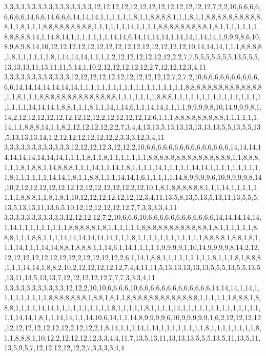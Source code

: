 3,3,3,3,3,3,3,3,3,3,3,3,3,3,3,3,12,12,12,12,12,12,12,12,12,12,12,12,12,7,2,2,10,6,6,6,6,6,6,6,6,14,6,6,14,6,6,6,14,14,14,1,1,1,1,1,1,8,1,1,8,8,8,8,1,1,1,8,1,1,8,8,8,8,8,8,8,8,8,8,8,1,1,8,1,1,1,8,8,8,8,8,8,8,8,8,1,1,1,1,1,1,14,1,1,1,1,8,8,8,8,8,8,8,8,8,1,8,1,1,1,1,1,1,1,8,8,8,8,8,14,1,14,8,14,1,1,1,1,1,1,1,14,14,6,14,14,14,14,1,14,14,1,14,14,1,9,9,9,8,6,10,8,9,8,9,8,14,10,12,12,12,12,12,12,12,12,12,12,12,12,12,12,12,10,14,14,14,1,1,1,8,8,8,8,1,8,1,1,1,1,1,1,8,1,14,14,14,1,1,1,1,2,12,12,12,12,12,12,2,2,7,7,5,5,5,5,5,5,5,13,5,5,5,13,13,13,11,13,11,11,5,14,1,10,2,12,12,12,12,12,2,7,12,12,12,3,4,11
3,3,3,3,3,3,3,3,3,3,3,3,12,12,12,12,12,12,12,12,12,12,12,7,2,7,2,10,6,6,6,6,6,6,6,6,6,6,6,6,14,14,14,14,14,14,14,1,1,1,1,1,1,1,1,1,1,1,1,1,1,1,1,1,1,1,8,8,8,8,8,8,8,8,8,8,8,8,8,8,1,1,8,1,1,1,8,8,8,8,8,8,8,8,8,8,8,8,8,8,1,1,1,1,1,1,1,8,8,8,1,1,1,1,1,1,1,1,1,1,1,1,1,1,1,1,1,1,1,1,14,14,14,1,8,8,1,1,1,8,1,1,14,1,14,6,1,1,14,14,1,1,1,1,9,9,9,9,8,10,14,9,9,9,8,1,14,2,12,12,12,12,12,12,12,12,12,2,12,12,12,12,12,6,1,1,1,8,8,8,8,8,8,8,8,8,1,1,1,1,1,1,14,1,1,8,8,8,14,1,1,8,2,12,12,12,12,2,2,7,3,4,4,13,13,5,13,13,13,13,13,13,5,5,13,5,5,13,5,13,13,13,14,1,2,12,12,12,12,12,12,2,3,3,3,12,3,4,11
3,3,3,3,3,3,3,3,3,3,3,3,12,12,12,12,3,12,12,2,10,6,6,6,6,6,6,6,6,6,6,6,6,6,6,6,14,14,14,14,14,14,14,14,14,14,1,1,1,1,8,1,1,8,1,1,1,1,1,1,1,8,8,8,8,8,8,8,8,8,8,8,8,8,8,8,1,1,8,8,8,1,1,1,8,1,8,8,1,14,8,8,8,1,1,1,14,1,1,14,1,8,1,1,1,1,14,1,1,1,1,1,14,14,1,1,1,1,1,1,1,1,1,1,8,1,1,1,1,1,1,14,14,1,8,1,1,8,8,1,1,1,14,14,1,6,1,1,1,1,1,14,8,9,9,9,9,6,10,9,9,9,9,8,14,10,2,12,12,12,12,12,12,12,12,12,12,12,12,2,12,10,1,8,1,8,8,8,8,8,8,1,1,1,14,1,1,1,1,1,1,1,1,8,8,8,1,1,8,1,8,1,10,12,12,12,12,12,12,12,3,4,11,13,5,8,13,5,13,5,13,11,13,5,5,5,13,5,13,13,11,13,6,5,10,12,12,12,12,12,12,7,7,3,3,3,3,4,11
3,3,3,3,3,3,3,3,3,3,3,12,12,12,12,7,2,10,6,6,6,10,6,6,6,6,6,6,6,6,6,6,6,6,14,14,14,14,14,1,14,1,1,1,1,1,1,1,1,1,8,8,8,8,8,1,8,1,1,1,1,1,1,8,8,8,8,8,8,8,8,8,8,8,8,1,8,1,1,1,1,1,1,8,8,8,1,1,1,8,8,1,1,1,14,14,14,14,14,14,1,1,1,8,1,1,1,1,1,1,1,1,1,1,1,1,8,8,8,8,1,8,8,1,8,1,1,1,14,1,1,1,14,14,8,8,1,8,8,8,1,1,14,6,1,14,1,1,1,1,1,9,9,9,9,1,10,14,9,9,9,9,8,14,2,12,12,12,12,12,12,12,12,12,2,12,12,12,12,2,6,1,14,1,8,8,1,1,1,1,1,1,1,1,1,8,1,1,1,8,1,8,8,8,1,1,1,14,14,1,8,8,2,10,2,12,12,12,12,12,7,4,4,11,11,5,13,13,13,13,13,5,5,5,13,5,5,13,5,13,11,13,5,13,13,7,12,12,12,12,12,7,7,7,3,3,3,4,11
3,3,3,3,3,3,3,3,3,3,3,12,12,2,10,10,6,6,6,6,10,6,6,6,6,6,6,6,6,6,6,6,6,6,14,14,14,1,14,1,1,1,1,1,1,1,1,1,8,8,8,8,8,8,8,1,8,8,1,8,1,1,8,8,8,8,8,8,8,8,8,8,8,8,8,1,1,1,1,1,1,8,8,8,1,8,8,8,1,1,1,1,14,14,1,1,1,1,1,1,1,1,1,1,8,1,1,1,1,1,8,1,1,1,1,14,1,1,1,1,1,1,1,1,1,1,1,1,1,1,1,1,14,14,1,8,1,1,14,14,1,1,14,10,6,14,1,1,14,8,9,9,9,9,6,10,9,9,9,9,9,1,6,2,12,12,12,12,12,12,12,12,12,12,12,2,12,12,2,1,8,14,1,1,1,14,1,14,1,1,1,1,1,1,1,1,8,1,1,1,1,1,1,1,1,8,1,1,8,8,8,1,10,12,2,12,12,12,12,3,3,4,4,11,7,13,5,13,11,13,13,13,5,5,5,13,5,11,13,5,11,13,5,9,5,7,12,12,12,12,12,2,7,3,3,3,3,4,4

